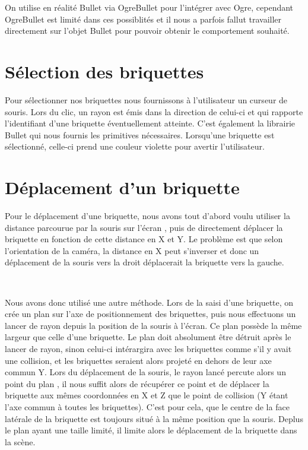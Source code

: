 \documentclass[frenchb,twoside]{EPURapport}
\begin{document}
        On utilise en réalité Bullet via OgreBullet pour l'intégrer avec Ogre,
        cependant OgreBullet est limité dans ces possiblités et il nous a
        parfois fallut travailler directement sur l'objet Bullet pour pouvoir
        obtenir le comportement souhaité. 

    \section{Sélection des briquettes}
        Pour sélectionner nos briquettes nous fournissons à l'utilisateur un
        curseur de souris. Lors du clic, un rayon est émis dans la direction de
        celui-ci et qui rapporte l'identifiant d'une briquette éventuellement
        atteinte. C'est également la librairie Bullet qui nous fournis les
        primitives nécessaires. Lorsqu'une briquette est sélectionné, celle-ci
        prend une couleur violette pour avertir l'utilisateur.
        
    \section{Déplacement d'un briquette}
        Pour le déplacement d'une briquette, nous avons tout d'abord voulu
         utiliser la distance parcourue par la souris sur l'écran
        , puis de directement déplacer la briquette en fonction de cette distance en X et Y.
        Le problème est que selon l'orientation de la caméra, la distance en X
        peut s'inverser et donc un déplacement de la souris vers la droit
        déplacerait la briquette vers la gauche.
        
        \
        
        Nous avons donc utilisé une autre méthode.
        Lors de la saisi d'une briquette, on crée un plan sur l'axe de positionnement
        des briquettes, puis nous effectuons un lancer de rayon depuis la position de
        la souris à l'écran. Ce plan possède la même largeur que celle d'une briquette.
        Le plan doit absolument être détruit après le lancer de rayon, sinon celui-ci intérargira avec
        les briquettes comme s'il y avait une collision, et les briquettes seraient alors projeté en dehors
        de leur axe commun Y.
        Lors du déplacement de la souris, le rayon lancé percute alors un point du plan
        , il nous suffit alors de récupérer ce point et de déplacer la briquette aux mêmes
        coordonnées en X et Z que le point de collision (Y étant l'axe commun à toutes les briquettes).
        C'est pour cela, que le centre de la face latérale de la briquette est toujours
		situé à la même position que la souris.
		Deplus le plan ayant une taille limité, il limite alors le déplacement de la briquette dans la scène.
		
\end{document}
